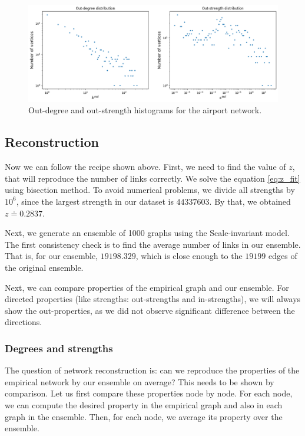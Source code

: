 \begin{figure}[!ht]
    \centering
    \includegraphics[scale=0.5]{../img/vanilla_SIM/deg_strengths.png}
    \caption{Out-degree and out-strength histograms for the airport network.}
    \label{fig:deg_strengths}
\end{figure}

\subsection{Reconstruction}
Now we can follow the recipe shown above. First, we need to find the value of $z$, that will reproduce the number of links correctly. We solve the equation \ref{eq:z_fit} using bisection method. To avoid numerical problems, we divide all strengths by $10^6$, since the largest strength in our dataset is $44\mathpunct{}337\mathpunct{}603$. By that, we obtained $z \doteq 0.2837$.

Next, we generate an ensemble of 1000 graphs using the Scale-invariant model. The first consistency check is to find the average number of links in our ensemble. That is, for our ensemble, $19\mathpunct{}198.329$, which is close enough to the $19\mathpunct{}199$ edges of the original ensemble.

Next, we can compare properties of the empirical graph and our ensemble. For directed properties (like strengths: out-strengths and in-strengths), we will always show the out-properties, as we did not observe significant difference between the directions.

\subsubsection{Degrees and strengths}
The question of network reconstruction is: can we reproduce the properties of the empirical network by our ensemble on average? This needs to be shown by comparison. Let us first compare these properties node by node. For each node, we can compute the desired property in the empirical graph and also in each graph in the ensemble. Then, for each node, we average its property over the ensemble. 

